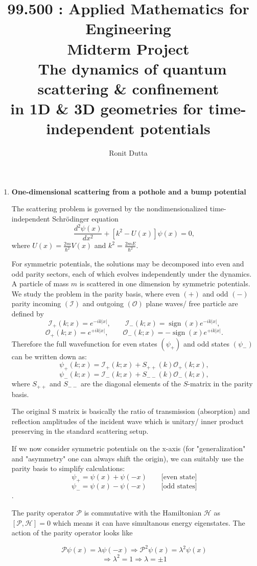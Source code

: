 \documentclass[12pt]{article}
\title{\Large 99.500 : Applied Mathematics for Engineering \\ Midterm Project \\ \
\textbf{The dynamics of quantum scattering \& confinement \\ in 1D \& 3D geometries for time-independent potentials}}
\author{Ronit Dutta}
\date{}
\begin{document}
\maketitle
\ignorespacesafterend
\begin{enumerate}
\item \textbf{\large One-dimensional scattering from a pothole and a bump potential}

The scattering problem is governed by the nondimensionalized time-independent Schrödinger equation
\[
\frac{d^2 \psi(x)}{dx^2} + \left[k^2 - U(x)\right]\psi(x) = 0,
\]
where \(U(x) = \frac{2m}{\hbar^2}V(x)\) and \(k^2 = \frac{2mE}{\hbar^2}\).

For symmetric potentials, the solutions may be decomposed into even and odd parity sectors, each of which evolves independently under the dynamics.
A particle of mass \(m\) is scattered in one dimension by symmetric potentials. We study the problem in the parity basis, where even \((+)\) and odd \((-)\) parity incoming $(\mathcal{I})$ and outgoing $(\mathcal{O})$ plane waves/ free particle are defined by
\[
\mathcal{I}_+(k;x)=e^{-ik|x|}, \qquad \mathcal{I}_-(k;x)=\operatorname{sign}(x)e^{-ik|x|},
\]
\[
\mathcal{O}_+(k;x)=e^{+ik|x|}, \qquad \mathcal{O}_-(k;x)=-\operatorname{sign}(x)e^{+ik|x|}.
\]
Therefore the full wavefunction for even states $(\psi_+)$ and odd states $(\psi_-)$ can be written down as:
\[
\psi_+(k;x)=\mathcal{I}_+(k;x)+S_{++}(k)\mathcal{O}_+(k;x),
\]
\[
\psi_-(k;x)=\mathcal{I}_-(k;x)+S_{--}(k)\mathcal{O}_-(k;x),
\]
where \(S_{++}\) and \(S_{--}\) are the diagonal elements of the \(S\)-matrix in the parity basis. 

The original S matrix is basically the ratio of transmission (absorption) and reflection amplitudes of the incident wave which is unitary/ inner product preserving in the standard scattering setup.

If we now consider symmetric potentials on the x-axis (for "generalization" and "asymmetry" one can always shift the origin), we can suitably use the parity basis to simplify calculations: \[
\psi_+ = \psi(x) + \psi(-x) \qquad \text{[even state]}
\] 
\[
\psi_- = \psi(x) - \psi(-x) \qquad \text{[odd states]}
\]. 

The parity operator $\mathcal{P}$ is commutative with the Hamiltonian $\mathcal{H}$ as $[\mathcal{P},\mathcal{H}] = 0$ which means it can have simultanous energy eigenstates. The action of the parity operator looks like 

\[
\mathcal{P} \psi(x) = \lambda \psi(-x) \Rightarrow \mathcal{P}^2 \psi(x) = \lambda^2 \psi(x)
\] 
\[ 
\Rightarrow\lambda^2 = 1 \Rightarrow \lambda = \pm 1
\]


\end{enumerate}
\end{document}
